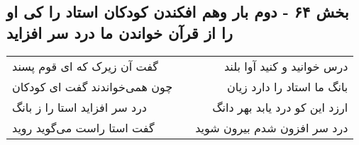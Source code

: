 \begin{center}
\section*{بخش ۶۴ - دوم بار وهم افکندن کودکان استاد را کی او را از قرآن خواندن ما درد سر افزاید}
\label{sec:sh064}
\begin{longtable}{l p{0.5cm} r}
گفت آن زیرک که ای قوم پسند
&&
درس خوانید و کنید آوا بلند
\\
چون همی‌خواندند گفت ای کودکان
&&
بانگ ما استاد را دارد زیان
\\
درد سر افزاید استا را ز بانگ
&&
ارزد این کو درد یابد بهر دانگ
\\
گفت استا راست می‌گوید روید
&&
درد سر افزون شدم بیرون شوید
\\
\end{longtable}
\end{center}
